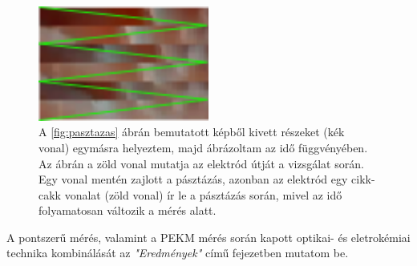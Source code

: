 \begin{figure}[h!]
\centering
\includegraphics[width=0.5\textwidth]{img/pasztazas2.png}
\caption{A \ref{fig:pasztazas} ábrán bemutatott képből kivett részeket (kék vonal) egymásra helyeztem, majd ábrázoltam az idő függvényében. Az ábrán a zöld vonal mutatja az elektród útját a vizsgálat során. Egy vonal mentén zajlott a pásztázás, azonban az elektród egy cikk-cakk vonalat (zöld vonal) ír le a pásztázás során, mivel az idő folyamatosan változik a mérés alatt.}
\label{fig:pasztazas2}
\end{figure}
A pontszerű mérés, valamint a PEKM mérés során kapott optikai- és eletrokémiai technika kombinálását az \emph{"Eredmények"} című fejezetben mutatom be.
